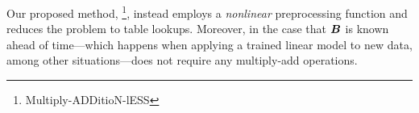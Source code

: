 Our proposed method, \ours\footnote{Multiply-ADDitioN-lESS}, instead employs a \textit{nonlinear} preprocessing function and reduces the problem to table lookups. Moreover, in the case that $\bm{B}$ is known ahead of time---which happens when applying a trained linear model to new data, among other situations---\oursp does not require any multiply-add operations.











